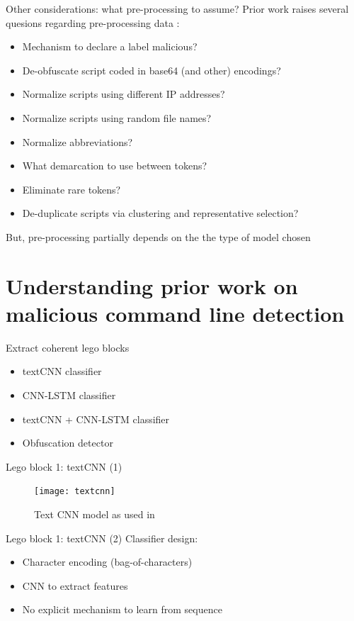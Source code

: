 \documentclass[10pt]{beamer}
\begin{document}
\begin{frame}{Other considerations: what pre-processing to assume?}
	Prior work raises several quesions regarding pre-processing data \cite{powershell2018,amsi2019,feye2018}:
	\begin{itemize}
		\item Mechanism to declare a label malicious?
		\item De-obfuscate script coded in base64 (and other) encodings?
		\item Normalize scripts using different IP addresses?
		\item Normalize scripts using random file names?
		\item Normalize abbreviations?
		\item What demarcation to use between tokens?
		\item Eliminate rare tokens?
		\item De-duplicate scripts via clustering and representative selection?
	\end{itemize}
	But, pre-processing partially depends on the the type of model chosen
\end{frame}

\section{Understanding prior work on malicious command line detection}

\begin{frame}[fragile]{Extract coherent lego blocks}
	\begin{itemize}
		\item textCNN classifier \cite{textcnn2016,textcnn2019,powershell2018}
		\item CNN-LSTM classifier \cite{amsi2019}
		\item textCNN + CNN-LSTM classifier \cite{amsi2019}
		\item Obfuscation detector \cite{feye2018}
	\end{itemize}
\end{frame}

\begin{frame}{Lego block 1: textCNN (1)}
	\begin{figure}
		\texttt{[image: textcnn]}
		\caption{Text CNN model as used in \cite{powershell2018}}
	\end{figure}
\end{frame}

\begin{frame}{Lego block 1: textCNN (2)}
	Classifier design:
	\begin{itemize}
		\item Character encoding (bag-of-characters)
		\item CNN to extract features
		\item No explicit mechanism to learn from sequence
	\end{itemize}
\end{frame}
\end{document}

